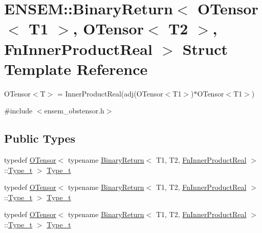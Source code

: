 \hypertarget{structENSEM_1_1BinaryReturn_3_01OTensor_3_01T1_01_4_00_01OTensor_3_01T2_01_4_00_01FnInnerProductReal_01_4}{}\section{E\+N\+S\+EM\+:\+:Binary\+Return$<$ O\+Tensor$<$ T1 $>$, O\+Tensor$<$ T2 $>$, Fn\+Inner\+Product\+Real $>$ Struct Template Reference}
\label{structENSEM_1_1BinaryReturn_3_01OTensor_3_01T1_01_4_00_01OTensor_3_01T2_01_4_00_01FnInnerProductReal_01_4}


O\+Tensor$<$\+T$>$ = Inner\+Product\+Real(adj(\+O\+Tensor$<$\+T1$>$)$\ast$\+O\+Tensor$<$\+T1$>$)  




{\ttfamily \#include $<$ensem\+\_\+obstensor.\+h$>$}

\subsection*{Public Types}
\begin{DoxyCompactItemize}
\item 
typedef \mbox{\hyperlink{classENSEM_1_1OTensor}{O\+Tensor}}$<$ typename \mbox{\hyperlink{structENSEM_1_1BinaryReturn}{Binary\+Return}}$<$ T1, T2, \mbox{\hyperlink{structENSEM_1_1FnInnerProductReal}{Fn\+Inner\+Product\+Real}} $>$\+::\mbox{\hyperlink{structENSEM_1_1BinaryReturn_3_01OTensor_3_01T1_01_4_00_01OTensor_3_01T2_01_4_00_01FnInnerProductReal_01_4_a4be584e269222cdb3c377aa0b77b45e3}{Type\+\_\+t}} $>$ \mbox{\hyperlink{structENSEM_1_1BinaryReturn_3_01OTensor_3_01T1_01_4_00_01OTensor_3_01T2_01_4_00_01FnInnerProductReal_01_4_a4be584e269222cdb3c377aa0b77b45e3}{Type\+\_\+t}}
\item 
typedef \mbox{\hyperlink{classENSEM_1_1OTensor}{O\+Tensor}}$<$ typename \mbox{\hyperlink{structENSEM_1_1BinaryReturn}{Binary\+Return}}$<$ T1, T2, \mbox{\hyperlink{structENSEM_1_1FnInnerProductReal}{Fn\+Inner\+Product\+Real}} $>$\+::\mbox{\hyperlink{structENSEM_1_1BinaryReturn_3_01OTensor_3_01T1_01_4_00_01OTensor_3_01T2_01_4_00_01FnInnerProductReal_01_4_a4be584e269222cdb3c377aa0b77b45e3}{Type\+\_\+t}} $>$ \mbox{\hyperlink{structENSEM_1_1BinaryReturn_3_01OTensor_3_01T1_01_4_00_01OTensor_3_01T2_01_4_00_01FnInnerProductReal_01_4_a4be584e269222cdb3c377aa0b77b45e3}{Type\+\_\+t}}
\item 
typedef \mbox{\hyperlink{classENSEM_1_1OTensor}{O\+Tensor}}$<$ typename \mbox{\hyperlink{structENSEM_1_1BinaryReturn}{Binary\+Return}}$<$ T1, T2, \mbox{\hyperlink{structENSEM_1_1FnInnerProductReal}{Fn\+Inner\+Product\+Real}} $>$\+::\mbox{\hyperlink{structENSEM_1_1BinaryReturn_3_01OTensor_3_01T1_01_4_00_01OTensor_3_01T2_01_4_00_01FnInnerProductReal_01_4_a4be584e269222cdb3c377aa0b77b45e3}{Type\+\_\+t}} $>$ \mbox{\hyperlink{structENSEM_1_1BinaryReturn_3_01OTensor_3_01T1_01_4_00_01OTensor_3_01T2_01_4_00_01FnInnerProductReal_01_4_a4be584e269222cdb3c377aa0b77b45e3}{Type\+\_\+t}}
\end{DoxyCompactItemize}


